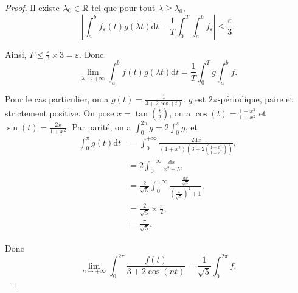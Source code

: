 \documentclass[12pt]{article}
\begin{document}
\begin{proof}
    Il existe $\lambda_{0}\in\mathbb{R}$ tel que pour tout $\lambda\geqslant\lambda_{0}$,
    \begin{equation*}
        \left\lvert\int_{a}^{b}f_{\varepsilon}(t)g(\lambda t)\mathrm{d}t-\frac{1}{T}\int_{0}^{T}\int_{a}^{b}f_{\varepsilon}\right\rvert\leqslant\frac{\varepsilon}{3}.
    \end{equation*}

    Ainsi, $\Gamma\leqslant\frac{\varepsilon}{3}\times 3=\varepsilon$. Donc 
    \begin{equation*}
        \boxed{
            \lim\limits_{\lambda\to+\infty}\int_{a}^{b}f(t)g(\lambda t)\mathrm{d}t=\frac{1}{T}\int_{0}^{T}g\int_{a}^{b}f.
        }
    \end{equation*}

    Pour le cas particulier, on a $g(t)=\frac{1}{3+2\cos(t)}$. $g$ est $2\pi$-périodique, paire et strictement positive. On pose $x=\tan\left(\frac{t}{2}\right)$, on a $\cos(t)=\frac{1-x^{2}}{1+x^{2}}$ et $\sin(t)=\frac{2x}{1+x^{2}}$. Par parité, on a $\int_{0}^{2\pi}g=2\int_{0}^{\pi}g$, et 
    \begin{align*}
        \int_{0}^{\pi}g(t)\mathrm{d}t
        &=\int_{0}^{+\infty}\frac{2\mathrm{d}x}{(1+x^{2})\left(3+2\left(\frac{1-x^{2}}{1+x^{2}}\right)\right)},\\
        &= 2\int_{0}^{+\infty}\frac{\mathrm{d}x}{x^{2}+5},\\
        &= \frac{2}{\sqrt{5}}\int_{0}^{+\infty}\frac{\frac{\mathrm{d}x}{\sqrt{5}}}{\left(\frac{x}{\sqrt{5}}\right)^{2}+1},\\
        &= \frac{2}{\sqrt{5}}\times\frac{\pi}{2},\\
        &=\frac{\pi}{\sqrt{5}}.
    \end{align*}

    Donc 
    \begin{equation*}
        \boxed{
            \lim\limits_{n\to+\infty}\int_{0}^{2\pi}\frac{f(t)}{3+2\cos(nt)}=\frac{1}{\sqrt{5}}\int_{0}^{2\pi}f.
        }
    \end{equation*}
\end{proof}
\end{document}
